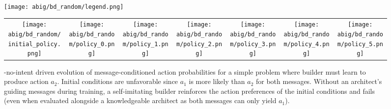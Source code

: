 %
\begin{figure}[h!]
    \centering
    \texttt{[image: abig/bd\_random/legend.png]}
    \begin{tabular}{ccccccc}
        \texttt{[image: abig/bd\_random/initial\_policy.png]} &\hspace{-0.4cm}  \texttt{[image: abig/bd\_random/policy\_0.png]} &\hspace{-0.4cm} \texttt{[image: abig/bd\_random/policy\_1.png]} &\hspace{-0.4cm}\texttt{[image: abig/bd\_random/policy\_2.png]} &\hspace{-0.4cm}\texttt{[image: abig/bd\_random/policy\_3.png]} &\hspace{-0.4cm}\texttt{[image: abig/bd\_random/policy\_4.png]} &\hspace{-0.4cm}\texttt{[image: abig/bd\_random/policy\_5.png]}
    \end{tabular}
    \caption{\abig-no-intent driven evolution of message-conditioned action probabilities for a simple problem where builder must learn to produce action $a_2$. Initial conditions are unfavorable since $a_1$ is more likely than $a_2$ for both messages. Without an architect's guiding messages during training, a self-imitating builder reinforces the action preferences of the initial conditions and fails (even when evaluated alongside a knowledgeable architect as both messages can only yield $a_1$).}
    \label{sup:fig_bd_radom}
\end{figure}

